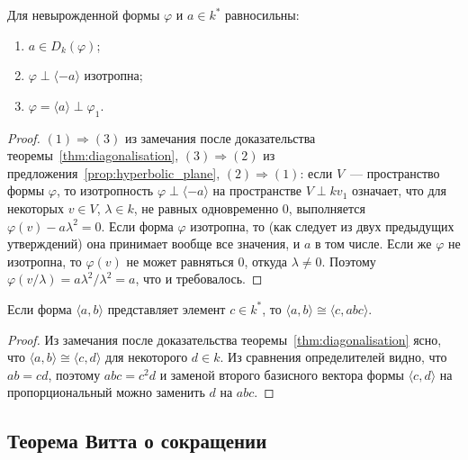 \documentclass[a4paper,oneside,12pt]{article}
\theoremstyle{plain} { \swapnumbers
\newtheorem{theorem}{Теорема}[subsection]
\newtheorem{corollary}[theorem]{Следствие}
\newtheorem{lemma}[theorem]{Лемма}
\newtheorem{proposition}[theorem]{Утверждение}
\newtheorem{claim}[theorem]{Факт}
}
\theoremstyle{definition} { \swapnumbers
\newtheorem{definition}[theorem]{Определение}
\newtheorem{notation}[theorem]{Обозначение}
\newtheorem{remark}[theorem]{Замечание}
\newtheorem{remarks}[theorem]{Замечания}
\newtheorem{example}[theorem]{Пример}
\newtheorem{examples}[theorem]{Примеры}
\newtheorem{sssection}[theorem]{}
}
\def\ph{\varphi}
\def\la{\langle}
\def\ra{\rangle}
\begin{document}
\begin{theorem}
Для невырожденной формы $\ph$ и $a\in k^*$ равносильны:
\begin{enumerate}
\item $a\in D_k(\ph)$;
\item $\ph\perp\la -a\ra$ изотропна;
\item $\ph=\la a\ra\perp\ph_1$.
\end{enumerate}
\end{theorem}
\begin{proof}
$(1)\Rightarrow(3)$ из замечания после доказательства теоремы~\ref{thm:diagonalisation},
$(3)\Rightarrow(2)$ из предложения~\ref{prop:hyperbolic_plane},
$(2)\Rightarrow(1)$: если $V$~--- пространство формы $\ph$, то изотропность
$\ph\perp\la -a\ra$ на пространстве $V\perp kv_1$ означает, что для
некоторых $v\in V$, $\lambda\in k$, не равных одновременно 0,
выполняется $\ph(v)-a\lambda^2=0$.
Если форма $\ph$ изотропна, то (как следует из двух предыдущих утверждений)
она принимает вообще все значения, и $a$ в том числе.
Если же $\ph$ не изотропна, то $\ph(v)$ не может равняться
$0$, откуда $\lambda\neq 0$.
Поэтому $\ph(v/\lambda)=a\lambda^2/\lambda^2=a$, что и требовалось.
\end{proof}

\begin{lemma}\label{lemma:representation_of_c}
Если форма $\la a,b\ra$ представляет элемент $c\in k^*$, то $\la a,b\ra\cong\la c,abc\ra$.
\end{lemma}
\begin{proof}
Из замечания после доказательства теоремы~\ref{thm:diagonalisation} ясно, что
$\la a,b\ra\cong\la c,d\ra$ для некоторого $d\in k$. Из сравнения определителей видно,
что $ab=cd$, поэтому $abc=c^2d$ и заменой второго базисного вектора формы $\la c,d\ra$ на
пропорциональный можно заменить $d$ на $abc$.
\end{proof}

\subsection{Теорема Витта о сокращении}
\end{document}
